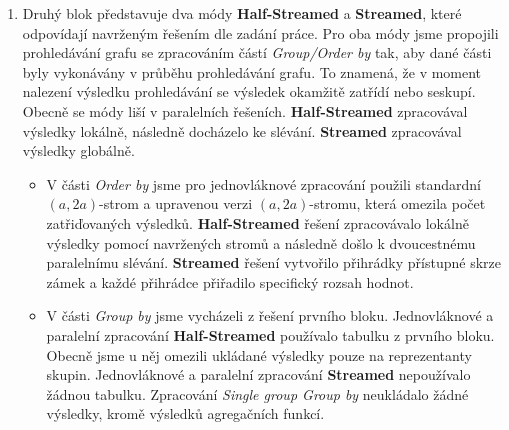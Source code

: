 \begin{enumerate}
\item
Druhý blok představuje dva módy \textbf{Half-Streamed} a \textbf{Streamed}, které odpovídají navrženým řešením dle zadání práce.
Pro oba módy jsme propojili prohledávání grafu se zpracováním částí \textit{Group/Order by} tak, aby dané části byly vykonávány v průběhu prohledávání grafu.
To znamená, že v moment nalezení výsledku prohledávání se výsledek okamžitě zatřídí nebo seskupí.
Obecně se módy liší v paralelních řešeních. 
\textbf{Half-Streamed} zpracovával výsledky lokálně, následně docházelo ke slévání.
\textbf{Streamed} zpracovával výsledky globálně.
\begin{itemize}
\item V části \textit{Order by} jsme pro jednovláknové zpracování použili standardní $(a, 2a)$-strom a upravenou verzi $(a, 2a)$-stromu, která omezila počet zatřiďovaných výsledků.  
\textbf{Half-Streamed} řešení zpracovávalo lokálně výsledky pomocí navržených stromů a následně došlo k dvoucestnému paralelnímu slévání.
\textbf{Streamed} řešení vytvořilo přihrádky přístupné skrze zámek a každé přihrádce přiřadilo specifický rozsah hodnot.
\item
V části \textit{Group by} jsme vycházeli z řešení prvního bloku.
Jednovláknové a paralelní zpracování \textbf{Half-Streamed} používalo tabulku z prvního bloku.
Obecně jsme u něj omezili ukládané výsledky pouze na reprezentanty skupin.
Jednovláknové a paralelní zpracování \textbf{Streamed} nepoužívalo žádnou tabulku.
Zpracování \textit{Single group Group by} neukládalo žádné výsledky, kromě výsledků agregačních funkcí.
\end{itemize}
\end{enumerate}

